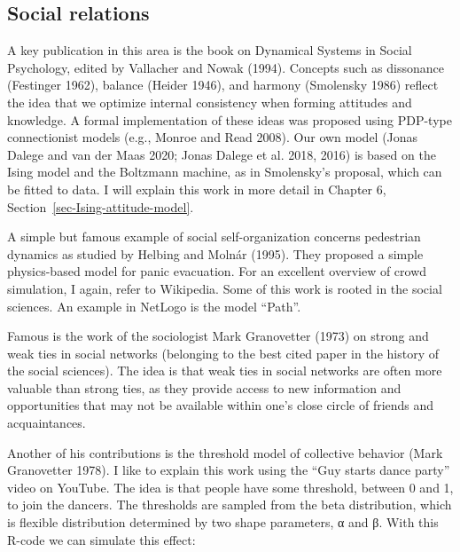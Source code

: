 \documentclass[
  a4paper,
  DIV=11,
  numbers=noendperiod]{scrreprt}
\begin{document}
\hypertarget{sec-Social-relations}{%
\subsection{Social relations}\label{sec-Social-relations}}

A key publication in this area is the book on Dynamical Systems in
Social Psychology, edited by Vallacher and Nowak (1994). Concepts such
as dissonance (Festinger 1962), balance (Heider 1946), and harmony
(Smolensky 1986) reflect the idea that we optimize internal consistency
when forming attitudes and knowledge. A formal implementation of these
ideas was proposed using PDP-type connectionist models (e.g., Monroe and
Read 2008). Our own model (Jonas Dalege and van der Maas 2020; Jonas
Dalege et al. 2018, 2016) is based on the Ising model and the Boltzmann
machine, as in Smolensky's proposal, which can be fitted to data. I will
explain this work in more detail in Chapter 6,
Section~\ref{sec-Ising-attitude-model}.

A simple but famous example of social self-organization concerns
pedestrian dynamics as studied by Helbing and Molnár (1995). They
proposed a simple physics-based model for panic evacuation. For an
excellent overview of crowd simulation, I again, refer to Wikipedia.
Some of this work is rooted in the social sciences. An example in
NetLogo is the model ``Path''.

Famous is the work of the sociologist Mark Granovetter (1973) on strong
and weak ties in social networks (belonging to the best cited paper in
the history of the social sciences). The idea is that weak ties in
social networks are often more valuable than strong ties, as they
provide access to new information and opportunities that may not be
available within one's close circle of friends and acquaintances.

Another of his contributions is the threshold model of collective
behavior (Mark Granovetter 1978). I like to explain this work using the
``Guy starts dance party'' video on YouTube. The idea is that people
have some threshold, between 0 and 1, to join the dancers. The
thresholds are sampled from the beta distribution, which is flexible
distribution determined by two shape parameters, α and β. With this
R-code we can simulate this effect:
\end{document}
